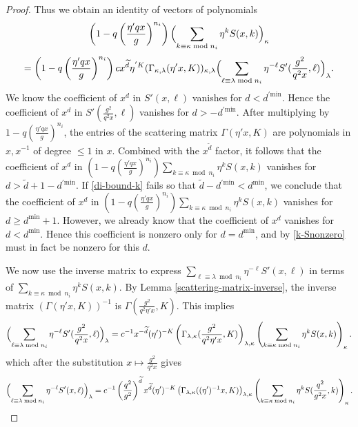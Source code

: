 \documentclass[11pt,letterpaper]{article}
\theoremstyle{definition}
\theoremstyle{remark}
\numberwithin{equation}{section}
\theoremstyle{dotless}
\renewcommand{\tilde}{\widetilde}
\begin{document}
\begin{proof}
Thus we obtain an identity of vectors of polynomials
\[  \left(1 - q \left( \frac{\eta'  qx}{g} \right)^{n_i} \right)      \Bigl( \sum_{k \equiv \kappa \bmod n_i}  \eta^{k} S(x,k) \Bigr)_\kappa\] \[= \left(1 - q \left( \frac{\eta' qx}{g} \right)^{n_i} \right)    c x^{\tilde{d}} \eta^{'K} (  \Gamma_{\kappa,\lambda }(  \eta' x, K))_{\kappa, \lambda } \Bigl( \sum_{\ell \equiv \lambda \bmod n_i} \eta^{-\ell} S'(\frac{g^2}{q^2x} ,\ell)\Bigr)_\lambda.\]
We know the coefficient of $x^d$ in $S'(x,\ell)$ vanishes for $d< d^{'\mathrm{min}}$. Hence the coefficient of $x^d$ in $S'(\frac{g^2}{q^2x} ,\ell)$ vanishes for $d>- d^{'\mathrm{min}}$. After multiplying by $1- q \left( \frac{  \eta' q x}{g}\right)^{n_i}$, the entries of the scattering matrix $\Gamma(\eta' x,K)$ are polynomials in $x, x^{-1} $ of degree $\leq 1$ in $x$. Combined with the $x^{\tilde{d}}$ factor, it follows that the coefficient of $x^d$ in $\left(1 - q \left( \frac{ \eta' qx}{g} \right)^{n_i} \right)      \sum_{k \equiv \kappa \bmod n_i}  \eta^{k} S(x,k)$ vanishes for $d> \tilde{d}+1 -d^{'\mathrm{min}}$. If \eqref{di-bound-k} fails so that $\tilde{d}- d^{'\mathrm{min}}<d^{\mathrm{min}}$, we conclude that the coefficient of $x^d$ in $\left(1 - q \left( \frac{\eta' qx}{g} \right)^{n_i} \right)      \sum_{k \equiv \kappa \bmod n_i}  \eta^{k} S(x,k)$  vanishes for $d \geq d^{\mathrm{min}}+1$. However, we already know that the coefficient of $x^d$ vanishes for $d< d^{\mathrm{min}}$. Hence this coefficient is nonzero only for $d= d^{\mathrm{min}}$, and by \eqref{k-Snonzero} must in fact be nonzero for this $d$.

We now use the inverse matrix to express $ \sum_{\ell \equiv \lambda \bmod n_i} \eta^{-\ell} S'(x,\ell)$ in terms of  $\sum_{k \equiv \kappa \bmod n_i}  \eta^{k} S(x,k)$. By Lemma \ref{scattering-matrix-inverse}, the inverse matrix $(\Gamma(\eta' x, K))^{-1}$ is $\Gamma( \frac{g^2}{q^2 \eta'  x}, K)$. This implies 
\[ \Bigl( \sum_{\ell \equiv \lambda \bmod n_i} \eta^{-\ell} S'(\frac{g^2}{q^2x} ,\ell)\Bigr)_\lambda = c^{-1} x^{-\tilde{d}} (\eta')^{-K} \left( \Gamma_{\lambda,\kappa}(  \frac{g^2}{q^2 \eta' x}, K) \right) _{\lambda, \kappa }  \left(\sum_{k \equiv \kappa \bmod n_i}  \eta^{k} S(x,k) \right)_{\kappa} .\]
which after the substitution $x \mapsto \frac{g^2}{q^2 x}$ gives
\[  \Bigl( \sum_{\ell \equiv \lambda \bmod n_i} \eta^{-\ell} S'(x ,\ell)\Bigr)_\lambda = c^{-1} \left( \frac{q^2}{g^2} \right)^{\tilde{d}} x^{\tilde{d}} (\eta')^{-K} \left( \Gamma_{\lambda,\kappa}( (\eta')^{-1} x, K) \right) _{\lambda, \kappa }  \left(\sum_{k \equiv \kappa \bmod n_i}  \eta^{k} S(\frac{q^2}{g^2x},k) \right)_{\kappa} .\]




\end{proof}
\end{document}
